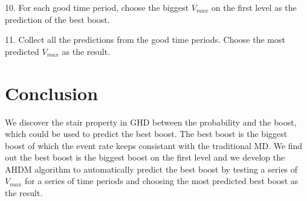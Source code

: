 \documentclass{article}
\begin{document}
10. For each good time period, choose the biggest $V_{max}$ on the first level as the prediction of the best boost.

11. Collect all the predictions from the good time periods. Choose the most predicted $V_{max}$ as the result.

\section{Conclusion}

We discover the stair property in GHD between the probability and the boost, which could be used to predict the best boost. The best boost is the biggest boost of which the event rate keeps consistant with the traditional MD. We find out the best boost is the biggest boost on the first level and we develop the AHDM algorithm to automatically predict the best boost by testing a series of $V_{max}$ for a series of time periods and choosing the most predicted best boost as the result.


\end{document}
